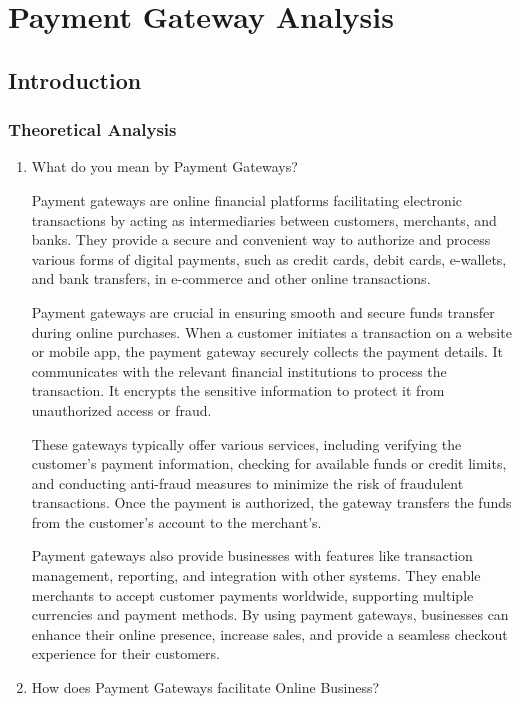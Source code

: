 

\chapter{Payment Gateway Analysis}
\setcounter{page}{1}
\section{Introduction}
\subsection*{Theoretical Analysis}
\begin{enumerate}
    \item What do you mean by Payment Gateways?

Payment gateways are online financial platforms facilitating electronic transactions by acting as intermediaries between customers, merchants, and banks. They provide a secure and convenient way to authorize and process various forms of digital payments, such as credit cards, debit cards, e-wallets, and bank transfers, in e-commerce and other online transactions.

Payment gateways are crucial in ensuring smooth and secure funds transfer during online purchases. When a customer initiates a transaction on a website or mobile app, the payment gateway securely collects the payment details. It communicates with the relevant financial institutions to process the transaction. It encrypts the sensitive information to protect it from unauthorized access or fraud.

These gateways typically offer various services, including verifying the customer's payment information, checking for available funds or credit limits, and conducting anti-fraud measures to minimize the risk of fraudulent transactions. Once the payment is authorized, the gateway transfers the funds from the customer's account to the merchant's.

Payment gateways also provide businesses with features like transaction management, reporting, and integration with other systems. They enable merchants to accept customer payments worldwide, supporting multiple currencies and payment methods. By using payment gateways, businesses can enhance their online presence, increase sales, and provide a seamless checkout experience for their customers.

 \item How does Payment Gateways facilitate Online Business?


\end{enumerate}
